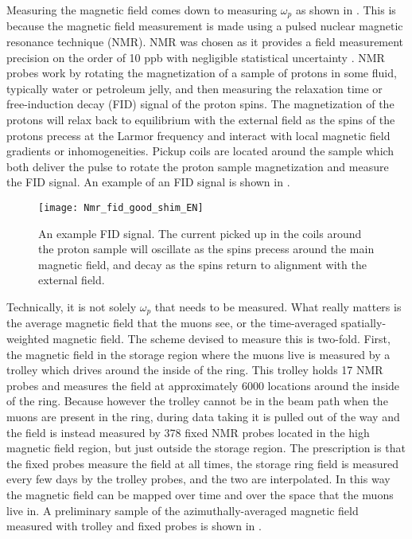 Measuring the magnetic field comes down to measuring $\omega_{p}$ as shown in . This is because the magnetic field measurement is made using a pulsed nuclear magnetic resonance technique (NMR). NMR was chosen as it provides a field measurement precision on the order of 10 ppb with negligible statistical uncertainty \cite{TDR}. NMR probes work by rotating the magnetization of a sample of protons in some fluid, typically water or petroleum jelly, and then measuring the relaxation time or free-induction decay (FID) signal of the proton spins. The magnetization of the protons will relax back to equilibrium with the external field as the spins of the protons precess at the Larmor frequency and interact with local magnetic field gradients or inhomogeneities. Pickup coils are located around the sample which both deliver the pulse to rotate the proton sample magnetization and measure the FID signal. An example of an FID signal is shown in .

\begin{figure}[]
    \centering
    \texttt{[image: Nmr\_fid\_good\_shim\_EN]}
    \caption[FID signal]{An example FID signal. The current picked up in the coils around the proton sample will oscillate as the spins precess around the main magnetic field, and decay as the spins return to alignment with the external field.}
    \label{fig:FID}
\end{figure}

Technically, it is not solely $\omega_{p}$ that needs to be measured. What really matters is the average magnetic field that the muons see, or the time-averaged spatially-weighted magnetic field. The scheme devised to measure this is two-fold. First, the magnetic field in the storage region where the muons live is measured by a trolley which drives around the inside of the ring. This trolley holds 17 NMR probes and measures the field at approximately 6000 locations around the inside of the ring. Because however the trolley cannot be in the beam path when the muons are present in the ring, during data taking it is pulled out of the way and the field is instead measured by 378 fixed NMR probes located in the high magnetic field region, but just outside the storage region. The prescription is that the fixed probes measure the field at all times, the storage ring field is measured every few days by the trolley probes, and the two are interpolated. In this way the magnetic field can be mapped over time and over the space that the muons live in. A preliminary sample of the azimuthally-averaged magnetic field measured with trolley and fixed probes is shown in .


